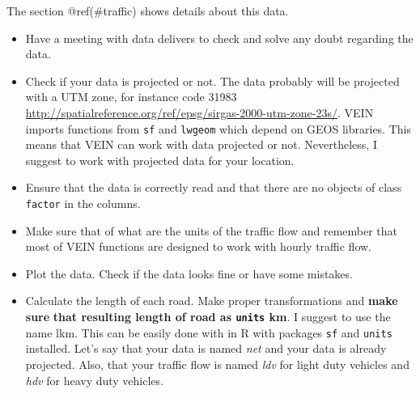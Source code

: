 \documentclass[12pt,graybox,envcountchap,sectrefs]{krantz}
\makeatletter
\newenvironment{Shaded}{\begin{snugshade}}{\end{snugshade}}
\newcommand{\KeywordTok}[1]{\textcolor[rgb]{0.13,0.29,0.53}{\textbf{#1}}}
\newcommand{\DataTypeTok}[1]{\textcolor[rgb]{0.13,0.29,0.53}{#1}}
\newcommand{\StringTok}[1]{\textcolor[rgb]{0.31,0.60,0.02}{#1}}
\newcommand{\CommentTok}[1]{\textcolor[rgb]{0.56,0.35,0.01}{\textit{#1}}}
\newcommand{\OperatorTok}[1]{\textcolor[rgb]{0.81,0.36,0.00}{\textbf{#1}}}
\newcommand{\ErrorTok}[1]{\textcolor[rgb]{0.64,0.00,0.00}{\textbf{#1}}}
\newcommand{\NormalTok}[1]{#1}
\providecommand{\tightlist}{%
  \setlength{\itemsep}{0pt}\setlength{\parskip}{0pt}}
\newenvironment{kframe}{%
\medskip{}
\setlength{\fboxsep}{.8em}
 \def\at@end@of@kframe{}%
 \ifinner\ifhmode%
  \def\at@end@of@kframe{\end{minipage}}%
  \begin{minipage}{\columnwidth}%
 \fi\fi%
 \def\FrameCommand##1{\hskip\@totalleftmargin \hskip-\fboxsep
 \colorbox{shadecolor}{##1}\hskip-\fboxsep
     \hskip-\linewidth \hskip-\@totalleftmargin \hskip\columnwidth}%
 \MakeFramed {\advance\hsize-\width
   \@totalleftmargin\z@ \linewidth\hsize
   \@setminipage}}%
 {\par\unskip\endMakeFramed%
 \at@end@of@kframe}
\renewenvironment{Shaded}{\begin{kframe}}{\end{kframe}}
\theoremstyle{definition}
\theoremstyle{definition}
\theoremstyle{definition}
\theoremstyle{remark}
\makeatother
\begin{document}
The section @ref(\#traffic) shows details about this data.

\begin{itemize}
\tightlist
\item
  Have a meeting with data delivers to check and solve any doubt
  regarding the data.
\item
  Check if your data is projected or not. The data probably will be
  projected with a UTM zone, for instance code 31983
  \url{http://spatialreference.org/ref/epsg/sirgas-2000-utm-zone-23s/}.
  VEIN imports functions from \texttt{sf} and \texttt{lwgeom} which
  depend on GEOS libraries. This means that VEIN can work with data
  projected or not. Nevertheless, I suggest to work with projected data
  for your location.
\item
  Ensure that the data is correctly read and that there are no objects
  of class \texttt{factor} in the columns.
\item
  Make sure that of what are the units of the traffic flow and remember
  that most of VEIN functions are designed to work with hourly traffic
  flow.
\item
  Plot the data. Check if the data looks fine or have some mistakes.
\item
  Calculate the length of each road. Make proper transformations and
  \textbf{make sure} \textbf{that resulting length of road as
  \texttt{units} km}. I suggest to use the name lkm. This can be easily
  done with in R with packages \texttt{sf} and \texttt{units} installed.
  Let's say that your data is named \emph{net} and your data is already
  projected. Also, that your traffic flow is named \emph{ldv} for light
  duty vehicles and \emph{hdv} for heavy duty vehicles.
\end{itemize}

\begin{Shaded}
\end{Shaded}
\end{document}

